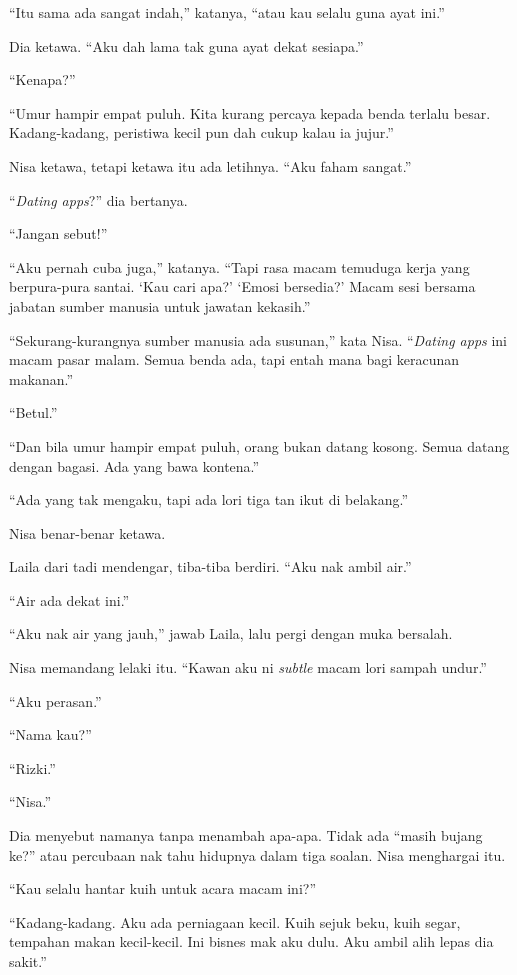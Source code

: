 \documentclass[
  11pt,
  a5paper,
  openany,
  oneside]{book}
\begin{document}
``Itu sama ada sangat indah,'' katanya, ``atau kau selalu guna ayat
ini.''

Dia ketawa. ``Aku dah lama tak guna ayat dekat sesiapa.''

``Kenapa?''

``Umur hampir empat puluh. Kita kurang percaya kepada benda terlalu
besar. Kadang-kadang, peristiwa kecil pun dah cukup kalau ia jujur.''

Nisa ketawa, tetapi ketawa itu ada letihnya. ``Aku faham sangat.''

``\emph{Dating apps}?'' dia bertanya.

``Jangan sebut!''

``Aku pernah cuba juga,'' katanya. ``Tapi rasa macam temuduga kerja yang
berpura-pura santai. `Kau cari apa?' `Emosi bersedia?' Macam sesi
bersama jabatan sumber manusia untuk jawatan kekasih.''

``Sekurang-kurangnya sumber manusia ada susunan,'' kata Nisa.
``\emph{Dating apps} ini macam pasar malam. Semua benda ada, tapi entah
mana bagi keracunan makanan.''

``Betul.''

``Dan bila umur hampir empat puluh, orang bukan datang kosong. Semua
datang dengan bagasi. Ada yang bawa kontena.''

``Ada yang tak mengaku, tapi ada lori tiga tan ikut di belakang.''

Nisa benar-benar ketawa.

Laila dari tadi mendengar, tiba-tiba berdiri. ``Aku nak ambil air.''

``Air ada dekat ini.''

``Aku nak air yang jauh,'' jawab Laila, lalu pergi dengan muka bersalah.

Nisa memandang lelaki itu. ``Kawan aku ni \emph{subtle} macam lori
sampah undur.''

``Aku perasan.''

``Nama kau?''

``Rizki.''

``Nisa.''

Dia menyebut namanya tanpa menambah apa-apa. Tidak ada ``masih bujang
ke?'' atau percubaan nak tahu hidupnya dalam tiga soalan. Nisa
menghargai itu.

``Kau selalu hantar kuih untuk acara macam ini?''

``Kadang-kadang. Aku ada perniagaan kecil. Kuih sejuk beku, kuih segar,
tempahan makan kecil-kecil. Ini bisnes mak aku dulu. Aku ambil alih
lepas dia sakit.''
\end{document}
